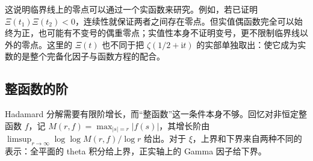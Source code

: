 这说明临界线上的零点可以通过一个实函数来研究。例如，若已证明 \(\Xi(t_1)\Xi(t_2)<0\)，连续性就保证两者之间存在零点。但实值偶函数完全可以始终为正，也可能有不变号的偶重零点；实值性本身不证明变号，更不限制临界线以外的零点。这里的 \(\Xi(t)\) 也不同于把 \(\zeta(1/2+\mathrm it)\) 的实部单独取出：使它成为实数的是整个完备化因子与函数方程的配合。

\subsection{整函数的阶}
\label{b3:subsec:260602}

Hadamard 分解需要有限阶增长，而“整函数”这一条件本身不够。回忆对非恒定整函数 \(f\)，记 \(M(r,f)=\max_{|s|=r}|f(s)|\)，其增长阶由 \(\limsup_{r\to\infty}\log\log M(r,f)/\log r\) 给出。对于 \(\xi\)，上界和下界来自两种不同的表示：全平面的 theta 积分给上界，正实轴上的 Gamma 因子给下界。

